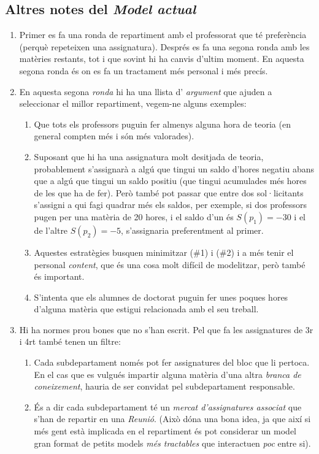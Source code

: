\documentclass[10pt,twocolumn]{article}
\begin{document}
	\subsection{Altres notes del \textit{Model actual}}
	\begin{enumerate}
		\item Primer es fa una ronda de repartiment amb el professorat que té preferència (perquè repeteixen una assignatura). Després es fa una segona ronda amb les matèries restants, tot i que sovint hi ha canvis d'ultim moment. En aquesta segona ronda  és on es fa un tractament més personal i més precís. 
		\item En aquesta segona \textit{ronda} hi ha una llista d' \textit{argument} que ajuden a seleccionar el millor repartiment, vegem-ne alguns exemples:
		\begin{enumerate}
			\item Que tots els professors puguin fer almenys alguna hora de teoria (en general compten més i són més valorades).
			\item Suposant que hi ha una assignatura molt desitjada de teoria, probablement s'assignarà a algú que tingui un saldo d'hores negatiu abans que a algú que tingui un saldo positiu (que tingui acumulades més hores de les que ha de fer). Però també pot passar que entre dos sol·licitants s'assigni a qui fagi quadrar més els saldos, per exemple, si dos professors pugen per una matèria de 20 hores, i el saldo d'un és $S(p_1)=-30$ i el de l'altre  $S(p_2)=-5$, s'assignaria preferentment al primer.
			\item Aquestes estratègies busquen minimitzar (\#1) i (\#2) i a més tenir el personal \textit{content}, que és una cosa molt difícil de modelitzar, però també és important.
			\item S'intenta que els alumnes de doctorat puguin fer unes poques hores d'alguna matèria que estigui relacionada amb el seu treball.
		\end{enumerate} 
		\item Hi ha normes prou bones que no s'han escrit. Pel que fa les assignatures de 3r i 4rt  també tenen un filtre:
		\begin{enumerate}
	\item  Cada subdepartament només pot fer assignatures del bloc que li pertoca. En el cas que es vulgués impartir alguna matèria d'una altra \textit{branca de coneixement}, hauria de ser convidat pel subdepartament responsable.
	\item És a dir cada subdepartament té un \textit{mercat d'assignatures associat} que s'han de repartir en una \textit{Reunió}. (Això dóna una bona idea, ja que així si més gent està implicada en el repartiment és pot considerar un model gran format de petits models \textit{més tractables} que interactuen \textit{poc} entre si).
			\end{enumerate}
		\end{enumerate}
\end{document}
